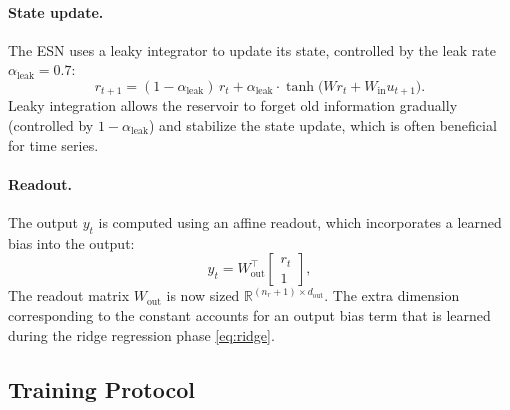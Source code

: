 \documentclass[11pt]{article}
\newcommand{\R}{\mathbb{R}}
\newcommand{\1}{\mathbf{1}}
\begin{document}
\paragraph{State update.}
The ESN uses a leaky integrator to update its state, controlled by the leak rate $\alpha_{\text{leak}} = 0.7$:
\begin{equation}\label{eq:state-update}
r_{t+1} = (1 - \alpha_{\text{leak}})\, r_t 
+ \alpha_{\text{leak}} \cdot \tanh\big(W r_t + W_{\text{in}} u_{t+1}\big).
\end{equation}
Leaky integration allows the reservoir to forget old information gradually (controlled by $1-\alpha_{\text{leak}}$) and stabilize the state update, which is often beneficial for time series.

\paragraph{Readout.}
The output $y_t$ is computed using an affine readout, which incorporates a learned bias into the output:
\begin{equation}\label{eq:readout}
y_t = W_{\text{out}}^\top 
\begin{bmatrix} r_t \\ 1 \end{bmatrix},
\end{equation}
The readout matrix $W_{\text{out}}$ is now sized $\R^{(n_r + 1) \times d_{\text{out}}}$. The extra dimension corresponding to the constant accounts for an output bias term that is learned during the ridge regression phase \ref{eq:ridge}.

\subsection{Training Protocol}\label{sec:training-protocol}
\end{document}
